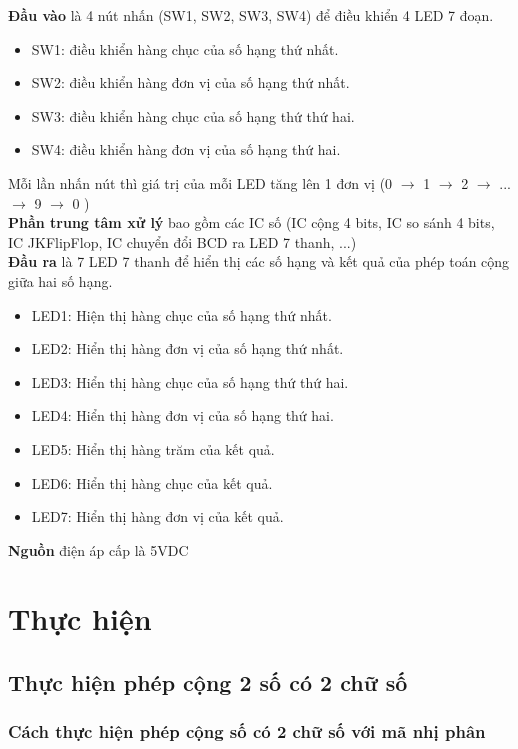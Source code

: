 \documentclass[10pt,a4paper]{report}
\begin{document}
\textbf{Đầu vào} là 4 nút nhấn (SW1, SW2, SW3, SW4) để điều khiển 4 LED 7 đoạn.
\begin{itemize}
	\item SW1: điều khiển hàng chục của số hạng thứ nhất.
	\item SW2: điều khiển hàng đơn vị của số hạng thứ nhất.
	\item SW3: điều khiển hàng chục của số hạng thứ thứ hai.
	\item SW4: điều khiển hàng đơn vị của số hạng thứ hai.
\end{itemize}

Mỗi lần nhấn nút thì giá trị của mỗi LED tăng lên 1 đơn vị (0 $\to$ 1 $\to$ 2 $\to$ ... $\to$ 9 $\to$ 0 )\\

\textbf{Phần trung tâm xử lý} bao gồm các IC số (IC cộng 4 bits, IC so sánh 4 bits, IC JKFlipFlop, IC chuyển đổi BCD ra LED 7 thanh, ...)\\

\textbf{Đầu ra} là 7 LED 7 thanh để hiển thị các số hạng và kết quả của phép toán cộng giữa hai số hạng.
\begin{itemize}
	\item LED1: Hiện thị hàng chục của số hạng thứ nhất.
	\item LED2: Hiển thị hàng đơn vị của số hạng thứ nhất.
	\item LED3: Hiển thị hàng chục của số hạng thứ thứ hai.
	\item LED4: Hiển thị hàng đơn vị của số hạng thứ hai.
	\item LED5: Hiển thị hàng trăm của kết quả.
	\item LED6: Hiển thị hàng chục của kết quả.
	\item LED7: Hiển thị hàng đơn vị của kết quả.
\end{itemize}

\textbf{Nguồn} điện áp cấp là 5VDC\\

\newpage
\chapter{Thực hiện}
\section{Thực hiện phép cộng 2 số có 2 chữ số}
\subsection{Cách thực hiện phép cộng số có 2 chữ số với mã nhị phân}
\end{document}
